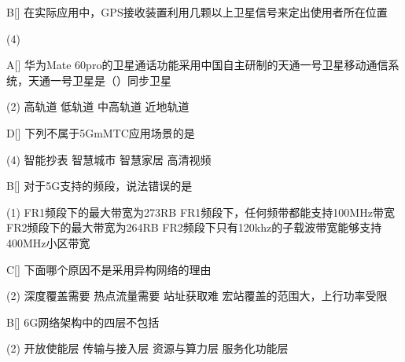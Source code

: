 \begin{choice}{B}[]
    在实际应用中，GPS接收装置利用几颗以上卫星信号来定出使用者所在位置
    \begin{tasks}(4)
    \end{tasks}
\end{choice}


\begin{choice}{A}[]
    华为Mate 60pro的卫星通话功能采用中国自主研制的天通一号卫星移动通信系统，天通一号卫星是（\quad）同步卫星
    \begin{tasks}(2)
        \task 高轨道
        \task 低轨道
        \task 中高轨道
        \task 近地轨道
    \end{tasks}
\end{choice}


\begin{choice}{D}[]
    下列不属于5GmMTC应用场景的是
    \begin{tasks}(4)
        \task 智能抄表
        \task 智慧城市
        \task 智慧家居
        \task 高清视频
    \end{tasks}
\end{choice}



\begin{choice}{B}[]
    对于5G支持的频段，说法错误的是
    \begin{tasks}(1)
        \task FR1频段下的最大带宽为273RB
        \task FR1频段下，任何频带都能支持100MHz带宽
        \task FR2频段下的最大带宽为264RB
        \task FR2频段下只有120khz的子载波带宽能够支持400MHz小区带宽
    \end{tasks}
\end{choice}


\begin{choice}{C}[]
    下面哪个原因不是采用异构网络的理由
    \begin{tasks}(2)
        \task 深度覆盖需要
        \task 热点流量需要
        \task 站址获取难
        \task 宏站覆盖的范围大，上行功率受限
    \end{tasks}
\end{choice}


\begin{choice}{B}[]
    6G网络架构中的四层不包括
    \begin{tasks}(2)
        \task 开放使能层
        \task 传输与接入层
        \task 资源与算力层
        \task 服务化功能层
    \end{tasks}
\end{choice}


